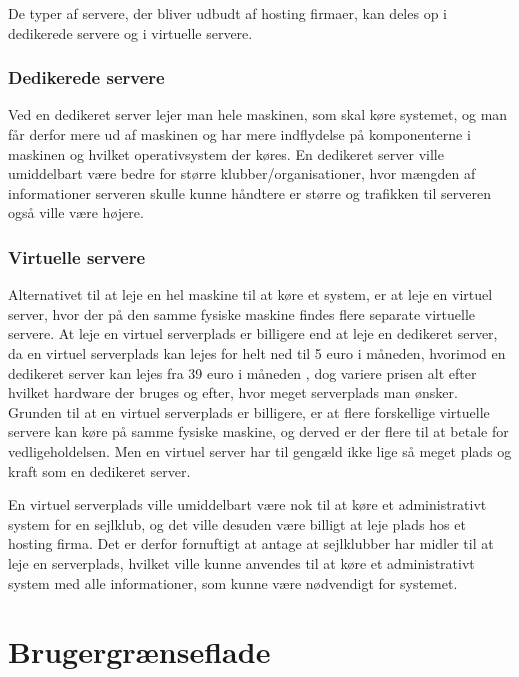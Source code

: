 De typer af servere, der bliver udbudt af hosting firmaer, kan deles op i dedikerede servere og i virtuelle
servere.


\subsubsection*{Dedikerede servere}

Ved en dedikeret server lejer man hele maskinen, som skal køre systemet, og man får derfor mere ud af maskinen
og har mere indflydelse på komponenterne i maskinen og hvilket operativsystem der køres. En dedikeret server
ville umiddelbart være bedre for større klubber/organisationer, hvor mængden af informationer serveren skulle
kunne håndtere er større og trafikken til serveren også ville være højere. \citep{server}


\subsubsection*{Virtuelle servere} 

Alternativet til at leje en hel maskine til at køre et system, er at leje en virtuel server, hvor der på den
samme fysiske maskine findes flere separate virtuelle servere. At leje en virtuel serverplads er billigere end
at leje en dedikeret server, da en virtuel serverplads kan lejes for helt ned til 5 euro i
måneden\citep{Virtuelserver}, hvorimod en dedikeret server kan lejes fra 39 euro i måneden
\citep{Dedikeretserver}, dog variere prisen alt efter hvilket hardware der bruges og efter, hvor meget
serverplads man ønsker. Grunden til at en virtuel serverplads er billigere, er at flere forskellige virtuelle
servere kan køre på samme fysiske maskine, og derved er der flere til at betale for vedligeholdelsen. Men en
virtuel server har til gengæld ikke lige så meget plads og kraft som en dedikeret server.\citep{server}

En virtuel serverplads ville umiddelbart være nok til at køre et administrativt system for en sejlklub, og det
ville desuden være billigt at leje plads hos et hosting firma. Det er derfor fornuftigt at antage at
sejlklubber har midler til at leje en serverplads, hvilket ville kunne anvendes til at køre et administrativt
system med alle informationer, som kunne være nødvendigt for systemet.


\section{Brugergrænseflade}

